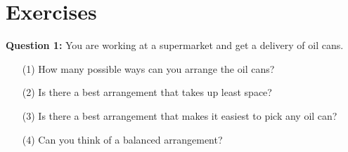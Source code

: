 \documentclass[12pt,a4paper]{article}
\begin{document}
\section{Exercises}
\noindent\textbf{Question 1:} You are working at a supermarket and get a delivery of oil cans.
\begin{enumerate}
\item[(1)] How many possible ways can you arrange the oil cans?
\item[(2)] Is there a best arrangement that takes up least space?
\item[(3)] Is there a best arrangement that makes it easiest to pick any oil can?
\item[(4)] Can you think of a balanced arrangement?
\end{enumerate}
%
%
\end{document}
